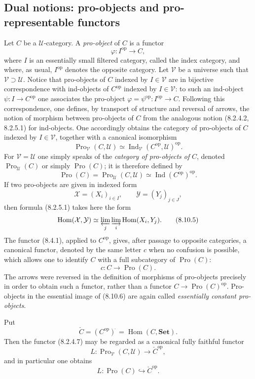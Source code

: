 \documentclass[11pt]{article}
\newcommand{\U}{\mathcal{U}}
\newcommand{\V}{\mathcal{V}}
\newcommand{\Set}{\mathbf{Set}}
\newcommand{\Hom}{\operatorname{Hom}}
\newcommand{\Ind}{\operatorname{Ind}}
\newcommand{\Pro}{\operatorname{Pro}}
\newcommand{\op}{\mathrm{op}}
\newcommand{\Hhom}{\operatorname{Hom}}
\begin{document}
\subsection{Dual notions: pro-objects and pro-representable functors}

Let $C$ be a $\U$-category. A \emph{pro-object} of $C$ is a functor
\[
 \varphi:I^\op\longrightarrow C,
\tag{8.10.1}
\]
where $I$ is an essentially small filtered category, called the index category, and where, as usual, $I^\op$ denotes the opposite category. Let $\V$ be a universe such that $\V\supset\U$. Notice that pro-objects of $C$ indexed by $I\in\V$ are in bijective correspondence with ind-objects of $C^\op$ indexed by $I\in\V$: to such an ind-object $\psi:I\to C^\op$ one associates the pro-object $\varphi=\psi^\op:I^\op\to C$. Following this correspondence, one defines, by transport of structure and reversal of arrows, the notion of morphism between pro-objects of $C$ from the analogous notion (8.2.4.2, 8.2.5.1) for ind-objects. One accordingly obtains the category of pro-objects of $C$ indexed by $I\in\V$, together with a canonical isomorphism
\[
 \Pro_\V(C,\U)\simeq \Ind_\V(C^\op,\U)^\op.
\tag{8.10.2}
\]
For $\V=\U$ one simply speaks of the \emph{category of pro-objects of} $C$, denoted $\Pro_\U(C)$ or simply $\Pro(C)$; it is therefore defined by
\[
 \Pro(C)=\Pro_\U(C,\U)\simeq \Ind(C^\op)^\op.
\tag{8.10.3}
\]
If two pro-objects are given in indexed form
\[
 \mathcal X=(X_i)_{i\in I},\qquad \mathcal Y=(Y_j)_{j\in J},
\tag{8.10.4}
\]
then formula (8.2.5.1) takes here the form
\[
 \Hom(\mathcal X,\mathcal Y)\simeq \varprojlim_j\varinjlim_i\Hom(X_i,Y_j).
\tag{8.10.5}
\]
The functor (8.4.1), applied to $C^\op$, gives, after passage to opposite categories, a canonical functor, denoted by the same letter $c$ when no confusion is possible, which allows one to identify $C$ with a full subcategory of $\Pro(C)$:
\[
 c:C\longrightarrow\Pro(C).
\tag{8.10.6}
\]
The arrows were reversed in the definition of morphisms of pro-objects precisely in order to obtain such a functor, rather than a functor $C\to\Pro(C)^\op$. Pro-objects in the essential image of (8.10.6) are again called \emph{essentially constant pro-objects}.

Put
\[
 \check C=(C^\op)^{\widehat{\ }}=\Hhom(C,\Set).
\tag{8.10.7}
\]
Then the functor (8.2.4.7) may be regarded as a canonical fully faithful functor
\[
 L:\Pro_\V(C,\U)\longrightarrow \check C^\op,
\tag{8.10.8}
\]
and in particular one obtains
\[
 L:\Pro(C)\hookrightarrow \check C^\op.
\tag{8.10.9}
\]
\end{document}
